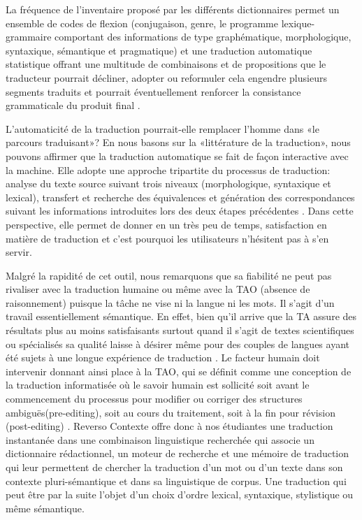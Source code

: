 \documentclass{textolivre}
\begin{document}
La fréquence de l’inventaire proposé par les différents dictionnaires permet un ensemble de codes de flexion (conjugaison, genre, le programme lexique-grammaire comportant des informations de type graphématique, morphologique, syntaxique, sémantique et pragmatique) et une traduction automatique statistique offrant une multitude de combinaisons et de propositions que le traducteur pourrait décliner, adopter ou reformuler \cite[p. 90]{paulsen2016} cela engendre plusieurs segments traduits et pourrait éventuellement renforcer la consistance grammaticale du produit final \cite{schneider2019}.

L’automaticité de la traduction pourrait-elle remplacer l’homme dans «le parcours traduisant»? En nous basons sur la «littérature de la traduction», nous pouvons affirmer que la traduction automatique se fait de façon interactive avec la machine. Elle adopte une approche tripartite du processus de traduction: analyse du texte source suivant trois niveaux (morphologique, syntaxique et lexical), transfert et recherche des équivalences et génération des correspondances suivant les informations introduites lors des deux étapes précédentes \cite[p. 150]{guidere2010,kubler2015}. Dans cette perspective, elle permet de donner en un très peu de temps, satisfaction en matière de traduction et c’est pourquoi les utilisateurs n’hésitent pas à s’en servir.

Malgré la rapidité de cet outil, nous remarquons que sa fiabilité ne peut pas rivaliser avec la traduction humaine ou même avec la TAO (absence de raisonnement) puisque la tâche ne vise ni la langue ni les mots. Il s’agit d’un travail essentiellement sémantique. En effet, bien qu’il arrive que la TA assure des résultats plus au moins satisfaisants surtout quand il s’agit de textes scientifiques ou spécialisés sa qualité laisse à désirer même pour des couples de langues ayant été sujets à une longue expérience de traduction \cite[p. 214]{aubin1995}. Le facteur humain doit intervenir donnant ainsi place à la TAO, qui se définit comme une conception de la traduction informatisée où le savoir humain est sollicité soit avant le commencement du processus pour modifier ou corriger des structures ambiguës(pre-editing), soit au cours du traitement, soit à la fin pour révision (post-editing) \cite{lab1988,alcina2008,paulsen2016}. Reverso Contexte offre donc à nos étudiantes une traduction instantanée dans une combinaison linguistique recherchée qui associe un dictionnaire rédactionnel, un moteur de recherche et une mémoire de traduction qui leur permettent de chercher la traduction d'un mot ou d’un texte dans son contexte pluri-sémantique et dans sa linguistique de corpus. Une traduction qui peut être par la suite l’objet d’un choix d’ordre lexical, syntaxique, stylistique ou même sémantique.
\end{document}
